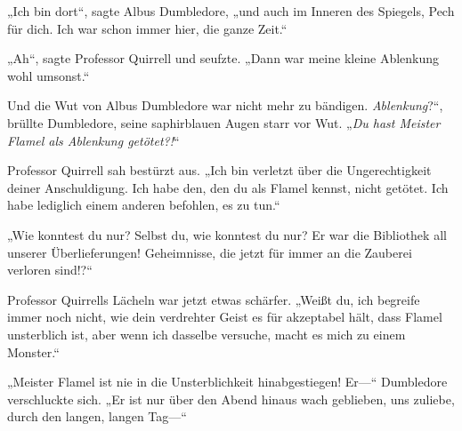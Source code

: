 „Ich bin dort“, sagte Albus Dumbledore, „und auch im Inneren des Spiegels, Pech für dich. Ich war schon immer hier, die ganze Zeit.“

„Ah“, sagte Professor Quirrell und seufzte. „Dann war meine kleine Ablenkung wohl umsonst.“

Und die Wut von Albus Dumbledore war nicht mehr zu bändigen.
\emph{Ablenkung}?“, brüllte Dumbledore, seine saphirblauen Augen starr vor Wut. „\emph{Du hast Meister Flamel als Ablenkung getötet?!}“

Professor Quirrell sah bestürzt aus. „Ich bin verletzt über die Ungerechtigkeit deiner Anschuldigung. Ich habe den, den du als Flamel kennst, nicht getötet. Ich habe lediglich einem anderen befohlen, es zu tun.“

„Wie konntest du nur? Selbst du, wie konntest du nur? Er war die Bibliothek all unserer Überlieferungen! Geheimnisse, die jetzt für immer an die Zauberei verloren sind!?“

Professor Quirrells Lächeln war jetzt etwas schärfer. „Weißt du, ich begreife immer noch nicht, wie dein verdrehter Geist es für akzeptabel hält, dass Flamel unsterblich ist, aber wenn ich dasselbe versuche, macht es mich zu einem Monster.“

„Meister Flamel ist nie in die Unsterblichkeit hinabgestiegen! Er—“ Dumbledore verschluckte sich. „Er ist nur über den Abend hinaus wach geblieben, uns zuliebe, durch den langen, langen Tag—“

